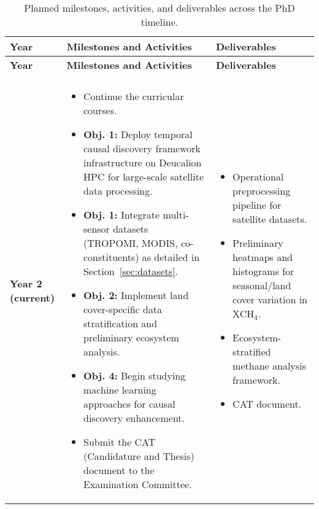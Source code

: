 \renewcommand{\arraystretch}{1.3}
\begin{longtable}{@{} >{\centering\arraybackslash}p{1.5cm} >{\centering\arraybackslash}p{7.5cm} >{\centering\arraybackslash}p{4.5cm} @{}}
	\caption[Planned milestones, activities, and deliverables]{Planned milestones, activities, and deliverables across the PhD timeline.}
	\label{tab:phd_milestones}                                                                        \\
	\toprule
	\textbf{Year}                        & \textbf{Milestones and Activities} & \textbf{Deliverables} \\
	\midrule
	\endfirsthead

	\toprule
	\textbf{Year}                        & \textbf{Milestones and Activities} & \textbf{Deliverables} \\
	\midrule
	\endhead

	\midrule
	\multicolumn{3}{r}{\small\textit{Table~\ref{tab:phd_milestones} continued on next page}}          \\
	\midrule
	\endfoot

	\bottomrule
	\endlastfoot

	\textbf{Year 2 (current)}            &
	\begin{minipage}[t]{8cm}\raggedright
		\begin{itemize}[left=0pt, labelsep=4pt, itemsep=2pt]
			\item Continue the curricular courses.
			\item \textbf{Obj. 1:} Deploy temporal causal discovery framework infrastructure on Deucalion HPC for large-scale satellite data processing.
			\item \textbf{Obj. 1:} Integrate multi-sensor datasets (TROPOMI, MODIS, co-constituents) as detailed in Section~\ref{sec:datasets}.
			\item \textbf{Obj. 2:} Implement land cover-specific data stratification and preliminary ecosystem analysis.
			\item \textbf{Obj. 4:} Begin studying machine learning approaches for causal discovery enhancement.
			\item Submit the CAT (Candidature and Thesis) document to the Examination Committee.
		\end{itemize}
	\end{minipage} &
	\begin{minipage}[t]{3cm}\raggedright
		\begin{itemize}[left=0pt, labelsep=4pt, itemsep=2pt]
			\item Operational preprocessing pipeline for satellite datasets.
			\item Preliminary heatmaps and histograms for seasonal/land cover variation in XCH$_4$.
			\item Ecosystem-stratified methane analysis framework.
			\item CAT document.
		\end{itemize}
	\end{minipage}                                                               \\


\end{longtable}
